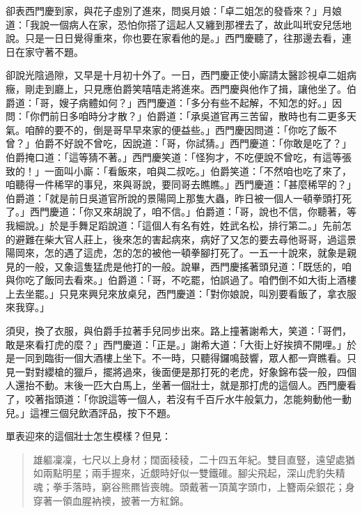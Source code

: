 卻表西門慶到家，與花子虛別了進來，問吳月娘：「卓二姐怎的發昏來？」月娘道：「我說一個病人在家，恐怕你搭了這起人又纏到那裡去了，故此叫玳安兒恁地說。只是一日日覺得重來，你也要在家看他的是。」西門慶聽了，往那邊去看，連日在家守著不題。

卻說光陰過隙，又早是十月初十外了。一日，西門慶正使小廝請太醫診視卓二姐病癥，剛走到廳上，只見應伯爵笑嘻嘻走將進來。西門慶與他作了揖，讓他坐了。伯爵道：「哥，嫂子病體如何？」西門慶道：「多分有些不起解，不知怎的好。」因問：「你們前日多咱時分才散？」伯爵道：「承吳道官再三苦留，散時也有二更多天氣。咱醉的要不的，倒是哥早早來家的便益些。」西門慶因問道：「你吃了飯不曾？」伯爵不好說不曾吃，因說道：「哥，你試猜。」西門慶道：「你敢是吃了？」伯爵掩口道：「這等猜不著。」西門慶笑道：「怪狗才，不吃便說不曾吃，有這等張致的！」一面叫小廝：「看飯來，咱與二叔吃。」伯爵笑道：「不然咱也吃了來了，咱聽得一件稀罕的事兒，來與哥說，要同哥去瞧瞧。」西門慶道：「甚麼稀罕的？」伯爵道：「就是前日吳道官所說的景陽岡上那隻大蟲，昨日被一個人一頓拳頭打死了。」西門慶道：「你又來胡說了，咱不信。」伯爵道：「哥，說也不信，你聽著，等我細說。」於是手舞足蹈說道：「這個人有名有姓，姓武名松，排行第二。」先前怎的避難在柴大官人莊上，後來怎的害起病來，病好了又怎的要去尋他哥哥，過這景陽岡來，怎的遇了這虎，怎的怎的被他一頓拳腳打死了。一五一十說來，就象是親見的一般，又象這隻猛虎是他打的一般。說畢，西門慶搖著頭兒道：「既恁的，咱與你吃了飯同去看來。」伯爵道：「哥，不吃罷，怕誤過了。咱們倒不如大街上酒樓上去坐罷。」只見來興兒來放桌兒，西門慶道：「對你娘說，叫別要看飯了，拿衣服來我穿。」

須臾，換了衣服，與伯爵手拉著手兒同步出來。路上撞著謝希大，笑道：「哥們，敢是來看打虎的麼？」西門慶道：「正是。」謝希大道：「大街上好挨擠不開哩。」於是一同到臨街一個大酒樓上坐下。不一時，只聽得鑼鳴鼓響，眾人都一齊瞧看。只見一對對纓槍的獵戶，擺將過來，後面便是那打死的老虎，好象錦布袋一般，四個人還抬不動。末後一匹大白馬上，坐著一個壯士，就是那打虎的這個人。西門慶看了，咬著指頭道：「你說這等一個人，若沒有千百斤水牛般氣力，怎能夠動他一動兒。」這裡三個兒飲酒評品，按下不題。

單表迎來的這個壯士怎生模樣？但見：
\begin{quote}
雄軀凜凜，七尺以上身材；闊面稜稜，二十四五年紀。雙目直豎，遠望處猶如兩點明星；兩手握來，近覷時好似一雙鐵碓。腳尖飛起，深山虎豹失精魂；拳手落時，窮谷熊羆皆喪魄。頭戴著一頂萬字頭巾，上簪兩朵銀花；身穿著一領血腥衲襖，披著一方紅錦。
\end{quote}

